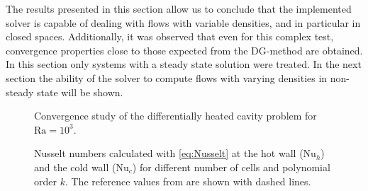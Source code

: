 The results presented in this section allow us to conclude that the implemented solver is capable of dealing with flows with variable densities, and in particular in closed spaces. Additionally, it was observed that even for this complex test, convergence properties close to those expected from the DG-method are obtained. In this section only systems with a steady state solution were treated. In the next section the ability of the solver to compute flows with varying densities in non-steady state will be shown.

\begin{figure}[tb]
	\centering
	\pgfplotsset{width=0.34\textwidth, compat=1.3}
	\caption{Convergence study of the differentially heated cavity problem for $\text{Ra} = 10^3$.}\label{fig:ConvergenceDHC}
\end{figure}
\begin{figure}[tb]
	\centering
	\caption{Nusselt numbers calculated with \cref{eq:Nusselt} at the hot wall ($\text{Nu}_h$) and the cold wall ($\text{Nu}_c$) for different number of cells and polynomial order $k$. The reference values from \cite{vierendeelsBenchmarkSolutionsNatural2003} are shown with dashed lines.}\label{fig:NusseltStudy}
\end{figure}
\FloatBarrier
